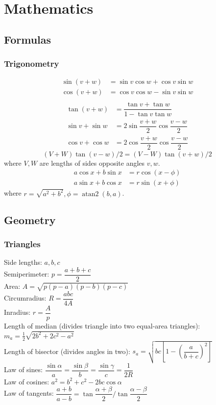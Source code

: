\chapter{Mathematics}

\section{Formulas}

\subsection{Trigonometry}
\begin{align*}
\sin(v+w)&{}=\sin v\cos w+\cos v\sin w\\
\cos(v+w)&{}=\cos v\cos w-\sin v\sin w\\
\end{align*}
\begin{align*}
\tan(v+w)&{}=\dfrac{\tan v+\tan w}{1-\tan v\tan w}\\
\sin v+\sin w&{}=2\sin\dfrac{v+w}{2}\cos\dfrac{v-w}{2}\\
\cos v+\cos w&{}=2\cos\dfrac{v+w}{2}\cos\dfrac{v-w}{2}
\end{align*}
\[ (V+W)\tan(v-w)/2{}=(V-W)\tan(v+w)/2 \]
where $V, W$ are lengths of sides opposite angles $v, w$.
\begin{align*}
    a\cos x+b\sin x&=r\cos(x-\phi)\\
    a\sin x+b\cos x&=r\sin(x+\phi)
\end{align*}
where $r=\sqrt{a^2+b^2}, \phi=\operatorname{atan2}(b,a)$.

\section{Geometry}
\subsection{Triangles}
Side lengths: $a,b,c$ \\
Semiperimeter: $p=\dfrac{a+b+c}{2}$ \\
Area: $A=\sqrt{p(p-a)(p-b)(p-c)}$\\
Circumradius: $R=\dfrac{abc}{4A}$\\
Inradius: $r=\dfrac{A}{p}$\\
Length of median (divides triangle into two equal-area triangles): 
$m_a=\tfrac{1}{2}\sqrt{2b^2+2c^2-a^2}$\\
Length of bisector (divides angles in two): 
$s_a=\sqrt{bc\left[1-\left(\dfrac{a}{b+c}\right)^2\right]}$\\
Law of sines: 
$\dfrac{\sin\alpha}{a}=\dfrac{\sin\beta}{b}=\dfrac{\sin\gamma}{c}=\dfrac{1}{2R}$\\
Law of cosines: 
$a^2=b^2+c^2-2bc\cos\alpha$\\
Law of tangents: $\dfrac{a+b}{a-b}=\tan\dfrac{\alpha+\beta}{2}/\tan\dfrac{\alpha-\beta}{2}$ \\

